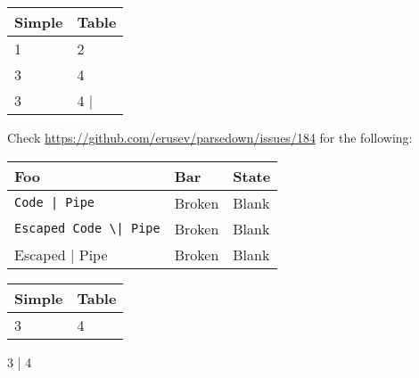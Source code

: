 \noindent\begin{tabularx}{\textwidth}{|X|X|}\hline
Simple & Table\\ \hline
1      & 2\\ \hline
3      & 4\\ \hline
3      & 4     |\\ \hline
\end{tabularx}

Check \url{https://github.com/erusev/parsedown/issues/184} for the following:


\noindent\begin{tabularx}{\textwidth}{|X|X|X|}\hline
Foo & Bar & State\\ \hline
\lstinline`Code | Pipe` & Broken & Blank\\ \hline
\lstinline`Escaped Code \| Pipe` & Broken & Blank\\ \hline
Escaped | Pipe & Broken & Blank\\ \hline
\end{tabularx}


\noindent\begin{tabularx}{\textwidth}{|l|X|}\hline
Simple & Table\\ \hline
3      & 4\\ \hline
\end{tabularx}

3      | 4

